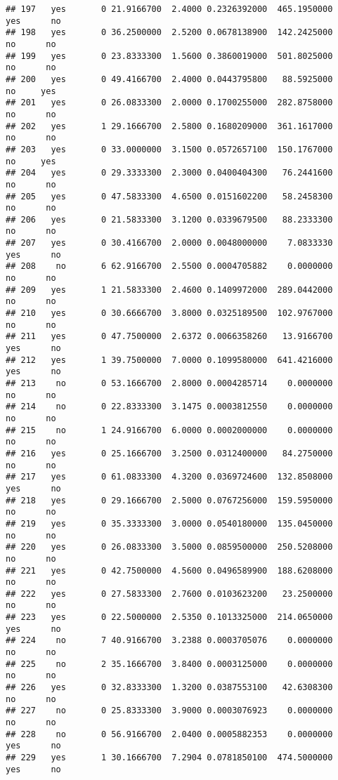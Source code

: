 \documentclass[]{article}
\begin{document}
\begin{verbatim}
## 197   yes       0 21.9166700  2.4000 0.2326392000  465.1950000   yes      no
## 198   yes       0 36.2500000  2.5200 0.0678138900  142.2425000    no      no
## 199   yes       0 23.8333300  1.5600 0.3860019000  501.8025000    no      no
## 200   yes       0 49.4166700  2.4000 0.0443795800   88.5925000    no     yes
## 201   yes       0 26.0833300  2.0000 0.1700255000  282.8758000    no      no
## 202   yes       1 29.1666700  2.5800 0.1680209000  361.1617000    no      no
## 203   yes       0 33.0000000  3.1500 0.0572657100  150.1767000    no     yes
## 204   yes       0 29.3333300  2.3000 0.0400404300   76.2441600    no      no
## 205   yes       0 47.5833300  4.6500 0.0151602200   58.2458300    no      no
## 206   yes       0 21.5833300  3.1200 0.0339679500   88.2333300    no      no
## 207   yes       0 30.4166700  2.0000 0.0048000000    7.0833330   yes      no
## 208    no       6 62.9166700  2.5500 0.0004705882    0.0000000    no      no
## 209   yes       1 21.5833300  2.4600 0.1409972000  289.0442000    no      no
## 210   yes       0 30.6666700  3.8000 0.0325189500  102.9767000    no      no
## 211   yes       0 47.7500000  2.6372 0.0066358260   13.9166700   yes      no
## 212   yes       1 39.7500000  7.0000 0.1099580000  641.4216000   yes      no
## 213    no       0 53.1666700  2.8000 0.0004285714    0.0000000    no      no
## 214    no       0 22.8333300  3.1475 0.0003812550    0.0000000    no      no
## 215    no       1 24.9166700  6.0000 0.0002000000    0.0000000    no      no
## 216   yes       0 25.1666700  3.2500 0.0312400000   84.2750000    no      no
## 217   yes       0 61.0833300  4.3200 0.0369724600  132.8508000   yes      no
## 218   yes       0 29.1666700  2.5000 0.0767256000  159.5950000    no      no
## 219   yes       0 35.3333300  3.0000 0.0540180000  135.0450000    no      no
## 220   yes       0 26.0833300  3.5000 0.0859500000  250.5208000    no      no
## 221   yes       0 42.7500000  4.5600 0.0496589900  188.6208000    no      no
## 222   yes       0 27.5833300  2.7600 0.0103623200   23.2500000    no      no
## 223   yes       0 22.5000000  2.5350 0.1013325000  214.0650000   yes      no
## 224    no       7 40.9166700  3.2388 0.0003705076    0.0000000    no      no
## 225    no       2 35.1666700  3.8400 0.0003125000    0.0000000    no      no
## 226   yes       0 32.8333300  1.3200 0.0387553100   42.6308300    no      no
## 227    no       0 25.8333300  3.9000 0.0003076923    0.0000000    no      no
## 228    no       0 56.9166700  2.0400 0.0005882353    0.0000000   yes      no
## 229   yes       1 30.1666700  7.2904 0.0781850100  474.5000000   yes      no

\end{verbatim}
\end{document}
